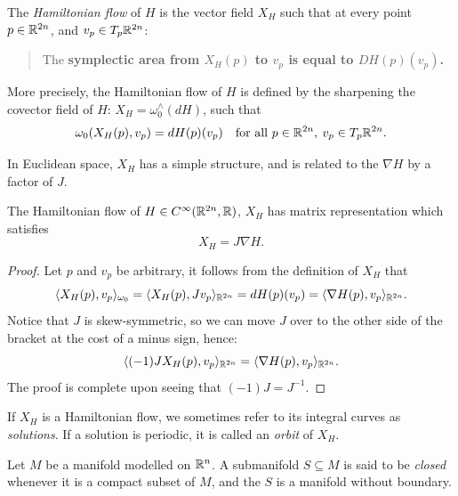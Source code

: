 \documentclass[../main-v2-manifolds.tex]{subfiles}
\begin{document}
\begin{definition}
    The \emph{Hamiltonian flow} of $H$ is the vector field $X_H$ such that at every point $p\in {\mathbb{R}^{2n}}$, and $v_p\in T_p{\mathbb{R}^{2n}}$:
    \begin{quote}
        The \textbf{symplectic area from $X_H(p)$ to $v_p$ is equal to $DH(p)(v_p)$.}
    \end{quote}
    More precisely, the Hamiltonian flow of $H$ is defined by the sharpening the covector field of $H$:  $X_H = \omega_0^{\wedge}(dH)$, such that
    \begin{equation}
        \omega_0(X_H(p), v_p) = dH(p)(v_p)\quad\text{for all }p\in {\mathbb{R}^{2n}},\: v_p\in T_p{\mathbb{R}^{2n}}.
        \label{eq:hamiltonian flow definition symplectic pairing}
    \end{equation}
\end{definition}
In Euclidean space, $X_H$ has a simple structure, and is related to the $\nabla H$ by a factor of $J$. 
\begin{lemma}\label{lem:hvf in euclidean space formula}
    The Hamiltonian flow of $H\in C^\infty({\mathbb{R}^{2n}},\mathbb{R})$, $X_H$ has matrix representation which satisfies
    \begin{equation}
        X_H = J\nabla H.
        \label{eq: hvf in euclidean space formula}
    \end{equation}
\end{lemma}
\begin{proof}
    Let $p$ and $v_p$ be arbitrary, it follows from the definition of $X_H$ that
    \[
        \langle X_H(p), v_p\rangle_{\omega_0} = \langle X_H(p), Jv_p\rangle_{{\mathbb{R}^{2n}}} = dH(p)(v_p) = \langle\nabla H(p), v_p\rangle_{{\mathbb{R}^{2n}}}.
    \]
    Notice that $J$ is skew-symmetric, so we can move $J$ over to the other side of the bracket at the cost of a minus sign, hence:
    \[
        \langle (-1)J X_H(p), v_p\rangle_{{\mathbb{R}^{2n}}} = \langle \nabla H(p),v_p\rangle_{{\mathbb{R}^{2n}}}.
    \]
    The proof is complete upon seeing that $(-1)J=J^{-1}$.
\end{proof}
\begin{remark}
    If $X_H$ is a Hamiltonian flow, we sometimes refer to its integral curves as \emph{solutions}. If a solution is periodic, it is called an \emph{orbit} of $X_H$.
\end{remark}
\begin{definition}\label{def:closed-submanifolds}
    Let $M$ be a manifold modelled on ${\mathbb{R}^n}$. A submanifold $S\subseteq M$ is said to be \emph{closed} whenever it is a compact subset of $M$, and the $S$ is a manifold without boundary.
\end{definition}
\end{document}
